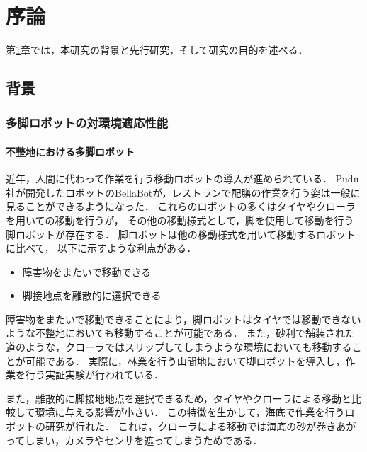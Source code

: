 ﻿
\chapter{序論}\label{chapter:序論}
第\ref{chapter:序論}章では，本研究の背景と先行研究，そして研究の目的を述べる．


\section{背景}


\subsection{多脚ロボットの対環境適応性能}
\subsubsection{不整地における多脚ロボット}
近年，人間に代わって作業を行う移動ロボットの導入が進められている．
Pudu社が開発したロボットのBellaBotが，レストランで配膳の作業を行う姿は一般に見ることができるようになった．
これらのロボットの多くはタイヤやクローラを用いての移動を行うが，
その他の移動様式として，脚を使用して移動を行う脚ロボットが存在する．
脚ロボットは他の移動様式を用いて移動するロボットに比べて，
以下に示すような利点がある\cite{Locomotion_for_difficult_terrain}．

\begin{itemize}
  \item 障害物をまたいで移動できる
  \item 脚接地点を離散的に選択できる
\end{itemize}

障害物をまたいで移動できることにより，脚ロボットはタイヤでは移動できないような不整地においても移動することが可能である．
また，砂利で舗装された道のような，クローラではスリップしてしまうような環境においても移動することが可能である．
実際に，林業を行う山間地において脚ロボットを導入し，作業を行う実証実験が行われている\cite{NEDO}．

また，離散的に脚接地地点を選択できるため，タイヤやクローラによる移動と比較して環境に与える影響が小さい．
この特徴を生かして，海底で作業を行うロボットの研究が行れた．
これは，クローラによる移動では海底の砂が巻きあがってしまい，カメラやセンサを遮ってしまうためである．

